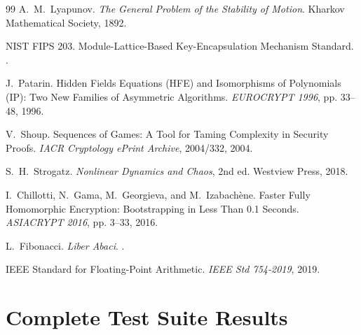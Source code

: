 \documentclass[11pt,a4paper]{article}
\begin{document}
\begin{thebibliography}{99}
A.~M.~Lyapunov.
\newblock \emph{The General Problem of the Stability of Motion}.
\newblock Kharkov Mathematical Society, 1892.

NIST FIPS 203.
\newblock Module-Lattice-Based Key-Encapsulation Mechanism Standard.
.

J.~Patarin.
\newblock Hidden Fields Equations (HFE) and Isomorphisms of Polynomials (IP): Two New Families of Asymmetric Algorithms.
\newblock \emph{EUROCRYPT 1996}, pp. 33--48, 1996.

V.~Shoup.
\newblock Sequences of Games: A Tool for Taming Complexity in Security Proofs.
\newblock \emph{IACR Cryptology ePrint Archive}, 2004/332, 2004.

S.~H.~Strogatz.
\newblock \emph{Nonlinear Dynamics and Chaos}, 2nd ed.
\newblock Westview Press, 2018.

I.~Chillotti, N.~Gama, M.~Georgieva, and M.~Izabachène.
\newblock Faster Fully Homomorphic Encryption: Bootstrapping in Less Than 0.1 Seconds.
\newblock \emph{ASIACRYPT 2016}, pp. 3--33, 2016.

L.~Fibonacci.
\newblock \emph{Liber Abaci}.
.

IEEE Standard for Floating-Point Arithmetic.
\newblock \emph{IEEE Std 754-2019}, 2019.

\end{thebibliography}

\newpage

\appendix

\section{Complete Test Suite Results}
\end{document}
